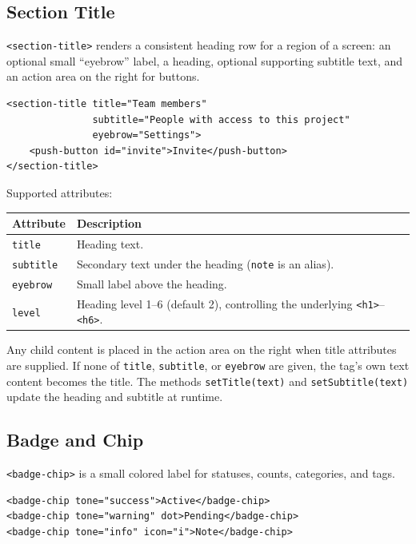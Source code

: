 \subsection{Section Title}
\label{sec:comp-section-title}

\texttt{<section-title>} renders a consistent heading row for a region of a screen: an optional small ``eyebrow'' label, a heading, optional supporting subtitle text, and an action area on the right for buttons.

\begin{lstlisting}[style=html]
<section-title title="Team members"
               subtitle="People with access to this project"
               eyebrow="Settings">
    <push-button id="invite">Invite</push-button>
</section-title>
\end{lstlisting}

\noindent
Supported attributes:

\begin{longtable}{P{3.8cm}P{6.7cm}}
\toprule
\textbf{Attribute} & \textbf{Description} \\
\midrule
\endhead
\texttt{title} & Heading text. \\
\texttt{subtitle} & Secondary text under the heading (\texttt{note} is an alias). \\
\texttt{eyebrow} & Small label above the heading. \\
\texttt{level} & Heading level 1--6 (default 2), controlling the underlying \texttt{<h1>}--\texttt{<h6>}. \\
\bottomrule
\end{longtable}

\noindent
Any child content is placed in the action area on the right when title attributes are supplied.  If none of \texttt{title}, \texttt{subtitle}, or \texttt{eyebrow} are given, the tag's own text content becomes the title.  The methods \texttt{setTitle(text)} and \texttt{setSubtitle(text)} update the heading and subtitle at runtime.

\subsection{Badge and Chip}
\label{sec:comp-badge}

\texttt{<badge-chip>} is a small colored label for statuses, counts, categories, and tags.

\begin{lstlisting}[style=html]
<badge-chip tone="success">Active</badge-chip>
<badge-chip tone="warning" dot>Pending</badge-chip>
<badge-chip tone="info" icon="i">Note</badge-chip>
\end{lstlisting}

